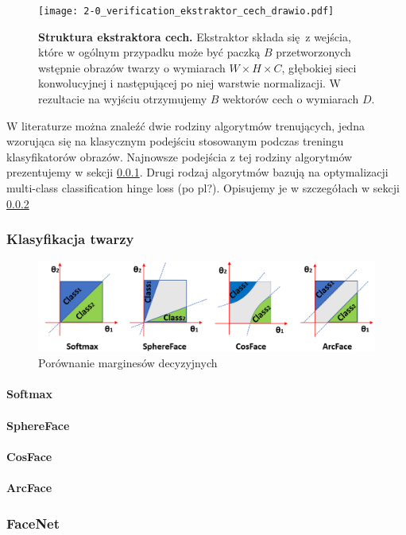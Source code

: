 \begin{figure}[h]
    \centering
    \texttt{[image: 2-0\_verification\_ekstraktor\_cech\_drawio.pdf]}
    \caption{\textbf{Struktura ekstraktora cech.} Ekstraktor składa się z wejścia, które w ogólnym przypadku może być paczką \(B\) przetworzonych wstępnie obrazów twarzy o wymiarach \( W \times H \times C\), głębokiej sieci konwolucyjnej i następującej po niej warstwie normalizacji. W rezultacie na wyjściu otrzymujemy \(B\) wektorów cech o wymiarach \(D\).}
    \label{fig:ekstraktor_cech}
\end{figure}


W literaturze można znaleźć dwie rodziny algorytmów trenujących, jedna wzorująca się na
klasycznym podejściu stosowanym podczas treningu klasyfikatorów obrazów. Najnowsze podejścia z
tej rodziny algorytmów prezentujemy w sekcji \ref{sec:klasyfikatory}. Drugi rodzaj algorytmów
bazują na optymalizacji multi-class classification hinge loss (po pl?). Opisujemy je w
szczegółach w sekcji \ref{sec:tripletloss}

\subsubsection{Klasyfikacja twarzy}\label{sec:klasyfikatory}
\begin{figure}[h!]
\centering
\includegraphics[width=1\linewidth]{img/margincompare.png}
\caption{Porównanie marginesów decyzyjnych\cite{}}
\vspace{-4mm}
\label{fig:binarymargin}
\end{figure}
\paragraph{Softmax\cite{Centreloss}}
\paragraph{SphereFace}
\paragraph{CosFace\cite{Cosface}}
\paragraph{ArcFace\cite{Arcface}}


\subsubsection{FaceNet}\label{sec:tripletloss}



